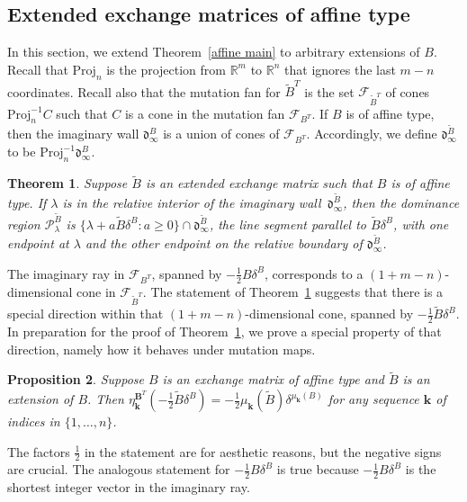 \documentclass{amsart}
\newtheorem{proposition}{Proposition}[section]
\newtheorem{theorem}[proposition]{Theorem}
\theoremstyle{definition}
\theoremstyle{remark}
\numberwithin{equation}{section}
\newcommand{\reals}{\mathbb R}
\newcommand{\set}[1]{{\lbrace #1 \rbrace}}
\newcommand{\F}{{\mathcal F}}
\newcommand{\0}{{\mathbf{0}}}
\newcommand{\Proj}{\mathrm{Proj}}
\newcommand{\kk}{{\boldsymbol{k}}}
\newcommand{\tB}{{\tilde{B}}}
\newcommand{\BB}{\mathbf{B}}
\renewcommand{\P}{\mathcal{P}}
\renewcommand{\d}{{\mathfrak d}}
\begin{document}
\subsection{Extended exchange matrices of affine type}
In this section, we extend Theorem~\ref{affine main} to arbitrary extensions of $B$.  
Recall that $\Proj_n$ is the projection from $\reals^m$ to $\reals^n$ that ignores the last $m-n$ coordinates.
Recall also that the mutation fan for $\tB^T$ is the set $\F_{\tB^T}$ of cones $\Proj_n^{-1}C$ such that $C$ is a cone in the mutation fan $\F_{B^T}$.
If $B$ is of affine type, then the imaginary wall $\d_\infty^B$ is a union of cones of $\F_{B^T}$.
Accordingly, we define $\d_\infty^\tB$ to be $\Proj_n^{-1}\d_\infty^B$.

\begin{theorem}\label{affine main extended}
Suppose $\tB$ is an extended exchange matrix such that $B$ is of affine type.
If $\lambda$ is in the relative interior of the imaginary wall~$\d^\tB_\infty$, then the dominance region $\P^\tB_\lambda$ is $\set{\lambda+a\tB\delta^B:a\ge0}\cap\d^\tB_\infty$, the line segment parallel to $\tB\delta^B$, with one endpoint at $\lambda$ and the other endpoint on the relative boundary of $\d^\tB_\infty$.
\end{theorem}

The imaginary ray in $\F_{B^T}$, spanned by $-\frac12B\delta^B$, corresponds to a $(1+m-n)$-dimensional cone in $\F_{\tB^T}$.
The statement of Theorem~\ref{affine main extended} suggests that there is a special direction within that $(1+m-n)$-dimensional cone, spanned by $-\frac12\tB\delta^B$.
In preparation for the proof of Theorem~\ref{affine main extended}, we prove a special property of that direction, namely how it behaves under mutation maps.

\begin{proposition}\label{delta is the tilde man}
Suppose $B$ is an exchange matrix of affine type and $\tB$ is an extension of $B$.
Then $\eta^{\BB^T}_\kk(-\frac12\tB\delta^B)=-\frac12\mu_\kk(\tB)\delta^{\mu_\kk(B)}$ for any sequence $\kk$ of indices in $\set{1,\ldots,n}$.
\end{proposition}
The factors $\frac12$ in the statement are for aesthetic reasons, but the negative signs are crucial.
The analogous statement for $-\frac12B\delta^B$ is true because $-\frac12B\delta^B$ is the shortest integer vector in the imaginary ray.
\end{document}
